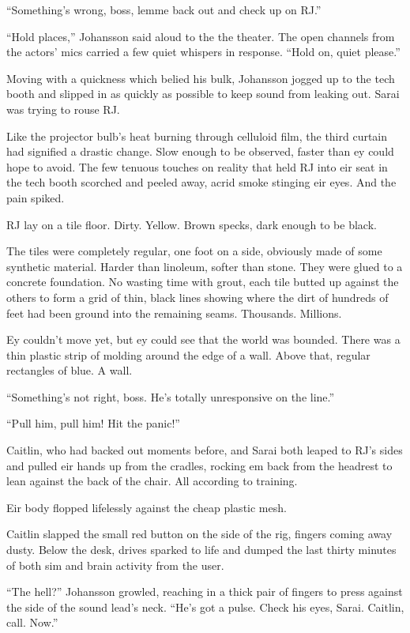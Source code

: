 ``Something's wrong, boss, lemme back out and check up on RJ.''

``Hold places,'' Johansson said aloud to the the theater. The open channels from the actors' mics carried a few quiet whispers in response. ``Hold on, quiet please.''

Moving with a quickness which belied his bulk, Johansson jogged up to the tech booth and slipped in as quickly as possible to keep sound from leaking out. Sarai was trying to rouse RJ.

Like the projector bulb's heat burning through celluloid film, the third curtain had signified a drastic change. Slow enough to be observed, faster than ey could hope to avoid. The few tenuous touches on reality that held RJ into eir seat in the tech booth scorched and peeled away, acrid smoke stinging eir eyes. And the pain spiked.

RJ lay on a tile floor. Dirty. Yellow. Brown specks, dark enough to be black.

The tiles were completely regular, one foot on a side, obviously made of some synthetic material. Harder than linoleum, softer than stone. They were glued to a concrete foundation. No wasting time with grout, each tile butted up against the others to form a grid of thin, black lines showing where the dirt of hundreds of feet had been ground into the remaining seams. Thousands. Millions.

Ey couldn't move yet, but ey could see that the world was bounded. There was a thin plastic strip of molding around the edge of a wall. Above that, regular rectangles of blue. A wall.

``Something's not right, boss. He's totally unresponsive on the line.''

``Pull him, pull him! Hit the panic!''

Caitlin, who had backed out moments before, and Sarai both leaped to RJ's sides and pulled eir hands up from the cradles, rocking em back from the headrest to lean against the back of the chair. All according to training.

Eir body flopped lifelessly against the cheap plastic mesh.

Caitlin slapped the small red button on the side of the rig, fingers coming away dusty. Below the desk, drives sparked to life and dumped the last thirty minutes of both sim and brain activity from the user.

``The hell?'' Johansson growled, reaching in a thick pair of fingers to press against the side of the sound lead's neck. ``He's got a pulse. Check his eyes, Sarai. Caitlin, call. Now.''

